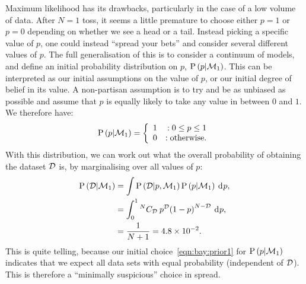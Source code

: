 Maximum likelihood has its drawbacks, particularly in the case of a low volume of data. After \(N=1\) toss, it seems a little premature to choose either \(p=1\) or \(p=0\) depending on whether we see a head or a tail. Instead picking a specific value of \(p\), one could instead ``spread your bets'' and consider several different values of \(p\). The full generalisation of this is to consider a continuum of models, and define an initial probability distribution on \(p\), \(\mathrm{P}\left(p\middle|\mathcal{M}_1\right)\). This can be interpreted as our initial assumptions on the value of \(p\), or our initial degree of belief in its value.
A non-partisan assumption is to try and be as unbiased as possible and assume that \(p\) is equally likely to take any value in between \(0\) and \(1\). We therefore have:
\begin{equation}
  \mathrm{P}\left(p\middle|\mathcal{M}_1\right)=\left\{
  \begin{array}{lr}
    1 &:0\le p\le1\\
    0 &:\text{otherwise.}\\
  \end{array}
  \right.\label{eqn:bay:prior1}
\end{equation}
With this distribution, we can work out what the overall probability of obtaining the dataset \(\mathcal{D}\) is, by marginalising over all values of \(p\):
\begin{align}
  \mathrm{P}\left(\mathcal{D}\middle|\mathcal{M}_1\right) 
  &= \int \mathrm{P}\left(\mathcal{D}\middle|p,\mathcal{M}_1\right)\mathrm{P}\left(p\middle|\mathcal{M}_1\right)\: \operatorname{d}^{}\!{p}, \\
  &= \int_0^1 {^{N}C_{\mathcal{D}}}\: {p}^{\mathcal{D}} {\left(1 - p \right)}^{N-\mathcal{D}}\: \operatorname{d}^{}\!{p}, \\
  &= \frac{1}{N+1} = 4.8\times10^{-2}.
  \label{eqn:bay:marg}
\end{align}
This is quite telling, because our initial choice~\eqref{eqn:bay:prior1} for \(\mathrm{P}\left(p\middle|\mathcal{M}_1\right)\) indicates that we expect all data sets with equal probability (independent of \(\mathcal{D}\)). This is therefore a ``minimally suspicious'' choice in spread.

